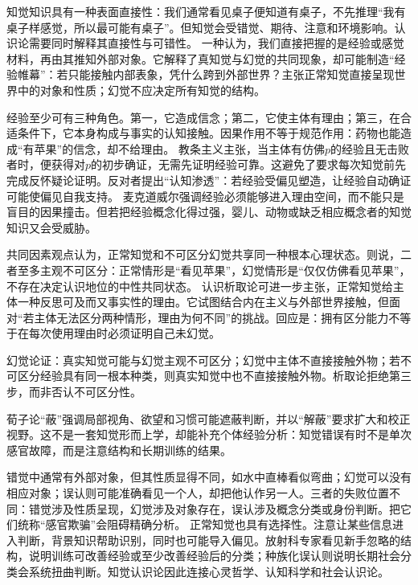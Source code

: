 知觉知识具有一种表面直接性：我们通常看见桌子便知道有桌子，不先推理“我有桌子样感觉，所以最可能有桌子”。但知觉会受错觉、期待、注意和环境影响。认识论需要同时解释其直接性与可错性。 一种认为，我们直接把握的是经验或感觉材料，再由其推知外部对象。它解释了真知觉与幻觉的共同现象，却可能制造“经验帷幕”：若只能接触内部表象，凭什么跨到外部世界？主张正常知觉直接呈现世界中的对象和性质；幻觉不应决定所有知觉的结构。

经验至少可有三种角色。第一，它造成信念；第二，它使主体有理由；第三，在合适条件下，它本身构成与事实的认知接触。因果作用不等于规范作用：药物也能造成“有苹果”的信念，却不给理由。 教条主义主张，当主体有仿佛$p$的经验且无击败者时，便获得对$p$的初步确证，无需先证明经验可靠\parencite{pryor2000}。这避免了要求每次知觉前先完成反怀疑论证明。反对者提出“认知渗透”：若经验受偏见塑造，让经验自动确证可能使偏见自我支持。 麦克道威尔强调经验必须能够进入理由空间，而不能只是盲目的因果撞击\parencite{mcDowell1994}。但若把经验概念化得过强，婴儿、动物或缺乏相应概念者的知觉知识又会受威胁。

共同因素观点认为，正常知觉和不可区分幻觉共享同一种根本心理状态。则说，二者至多主观不可区分：正常情形是“看见苹果”，幻觉情形是“仅仅仿佛看见苹果”，不存在决定认识地位的中性共同状态\parencite{martin2004}。 认识析取论可进一步主张，正常知觉给主体一种反思可及而又事实性的理由。它试图结合内在主义与外部世界接触，但面对“若主体无法区分两种情形，理由为何不同”的挑战。回应是：拥有区分能力不等于在每次使用理由时必须证明自己未幻觉。

\begin{argumentbox}
幻觉论证：真实知觉可能与幻觉主观不可区分；幻觉中主体不直接接触外物；若不可区分经验具有同一根本种类，则真实知觉中也不直接接触外物。析取论拒绝第三步，而非否认不可区分性。
\end{argumentbox}

\begin{comparison}
荀子论“蔽”强调局部视角、欲望和习惯可能遮蔽判断，并以“解蔽”要求扩大和校正视野\parencite{xunzi2014}。这不是一套知觉形而上学，却能补充个体经验分析：知觉错误有时不是单次感官故障，而是注意结构和长期训练的结果。
\end{comparison}

错觉中通常有外部对象，但其性质显得不同，如水中直棒看似弯曲；幻觉可以没有相应对象；误认则可能准确看见一个人，却把他认作另一人。三者的失败位置不同：错觉涉及性质呈现，幻觉涉及对象存在，误认涉及概念分类或身份判断。把它们统称“感官欺骗”会阻碍精确分析。 正常知觉也具有选择性。注意让某些信息进入判断，背景知识帮助识别，同时也可能导入偏见。放射科专家看见新手忽略的结构，说明训练可改善经验或至少改善经验后的分类；种族化误认则说明长期社会分类会系统扭曲判断。知觉认识论因此连接心灵哲学、认知科学和社会认识论。

